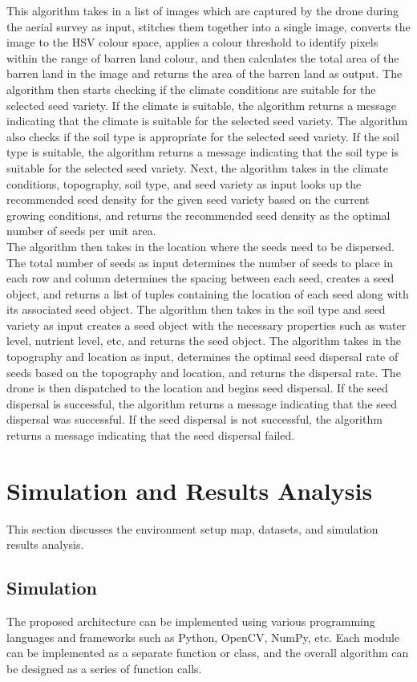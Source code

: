 \documentclass[conference]{IEEEtran}
\begin{document}
 This algorithm takes in a list of images which are captured by the drone during the aerial survey as input, stitches them together into a single image, converts the image to the HSV colour space, applies a colour threshold to identify pixels within the range of barren land colour, and then calculates the total area of the barren land in the image and returns the area of the barren land as output. The algorithm then starts checking if the climate conditions are suitable for the selected seed variety. If the climate is suitable, the algorithm returns a message indicating that the climate is suitable for the selected seed variety. The algorithm also checks if the soil type is appropriate for the selected seed variety. If the soil type is suitable, the algorithm returns a message indicating that the soil type is suitable for the selected seed variety. Next, the algorithm takes in the climate conditions, topography, soil type, and seed variety as input looks up the recommended seed density for the given seed variety based on the current growing conditions, and returns the recommended seed density as the optimal number of seeds per unit area. 
\\The algorithm then takes in the location where the seeds need to be dispersed. The total number of seeds as input determines the number of seeds to place in each row and column determines the spacing between each seed, creates a seed object, and returns a list of tuples containing the location of each seed along with its associated seed object. The algorithm then takes in the soil type and seed variety as input creates a seed object with the necessary properties such as water level, nutrient level, etc, and returns the seed object. The algorithm takes in the topography and location as input, determines the optimal seed dispersal rate of seeds based on the topography and location, and returns the dispersal rate. The drone is then dispatched to the location and begins seed dispersal. If the seed dispersal is successful, the algorithm returns a message indicating that the seed dispersal was successful. If the seed dispersal is not successful, the algorithm returns a message indicating that the seed dispersal failed.

\section{Simulation and Results Analysis}
This section discusses the environment setup map, datasets, and simulation results analysis.
\subsection{Simulation}
The proposed architecture can be implemented using various programming languages and frameworks such as Python, OpenCV, NumPy, etc. Each module can be implemented as a separate function or class, and the overall algorithm can be designed as a series of function calls.
\end{document}

